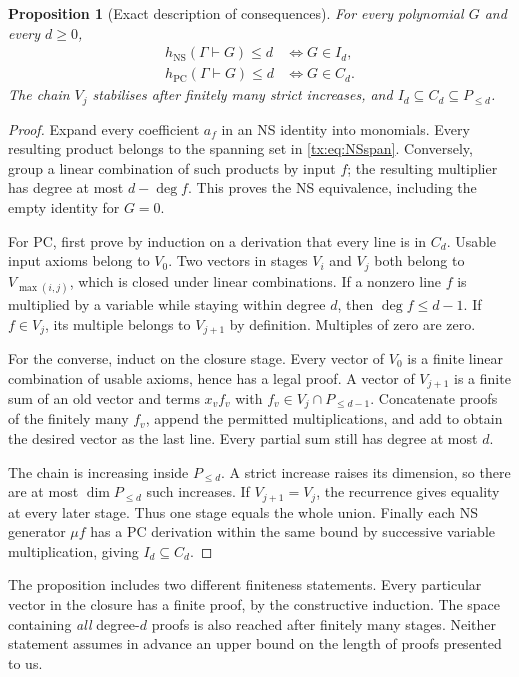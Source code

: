 \documentclass[11pt,a4paper,oneside,openany]{book}
\newtheorem{proposition}[theorem]{Proposition}
\theoremstyle{definition}\newtheorem{definition}[theorem]{Definition}
\theoremstyle{remark}\newtheorem{remark}[theorem]{Remark}
\newcommand{\NS}{\mathrm{NS}}\newcommand{\PC}{\mathrm{PC}}
\numberwithin{equation}{chapter}
\begin{document}
\begin{proposition}[Exact description of consequences]\label{tx:prop:closure}
For every polynomial $G$ and every $d\ge0$,
\[
 \begin{aligned}
 h_{\NS}(\Gamma\vdash G)\le d&\iff G\in I_d,\\
 h_{\PC}(\Gamma\vdash G)\le d&\iff G\in C_d.
 \end{aligned}
\]
The chain $V_j$ stabilises after finitely many strict increases, and
$I_d\subseteq C_d\subseteq P_{\le d}$.
\end{proposition}
\begin{proof}
Expand every coefficient $a_f$ in an NS identity into monomials.
Every resulting product belongs to the spanning set in
\eqref{tx:eq:NSspan}. Conversely, group a linear combination of such
products by input $f$; the resulting multiplier has degree at most
$d-\deg f$. This proves the NS equivalence, including the empty
identity for $G=0$.

For PC, first prove by induction on a derivation that every line is in
$C_d$. Usable input axioms belong to $V_0$. Two vectors in stages $V_i$
and $V_j$ both belong to $V_{\max(i,j)}$, which is closed under linear
combinations. If a nonzero line $f$ is multiplied by a variable while
staying within degree $d$, then $\deg f\le d-1$. If $f\in V_j$, its
multiple belongs to $V_{j+1}$ by definition. Multiples of zero are zero.

For the converse, induct on the closure stage. Every vector of $V_0$
is a finite linear combination of usable axioms, hence has a legal
proof. A vector of $V_{j+1}$ is a finite sum of an old vector and
terms $x_vf_v$ with $f_v\in V_j\cap P_{\le d-1}$. Concatenate proofs
of the finitely many $f_v$, append the permitted multiplications, and
add to obtain the desired vector as the last line. Every partial sum
still has degree at most $d$.

The chain is increasing inside $P_{\le d}$. A strict increase raises
its dimension, so there are at most $\dim P_{\le d}$ such increases.
If $V_{j+1}=V_j$, the recurrence gives equality at every later stage.
Thus one stage equals the whole union. Finally each NS generator
$\mu f$ has a PC derivation within the same bound by successive
variable multiplication, giving $I_d\subseteq C_d$.
\end{proof}

The proposition includes two different finiteness statements. Every
particular vector in the closure has a finite proof, by the constructive
induction. The space containing \emph{all} degree-$d$ proofs is also
reached after finitely many stages. Neither statement assumes in advance
an upper bound on the length of proofs presented to us.
\end{document}
